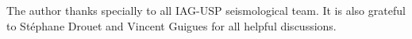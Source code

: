 \documentclass[grl]{agutex}
\begin{document}
\begin{article}
\begin{acknowledgments}
The author thanks specially to 
all IAG-USP seismological team. It is also grateful to Stéphane Drouet and Vincent Guigues for all helpful discussions.
\end{acknowledgments}
















\end{article}
\end{document}

